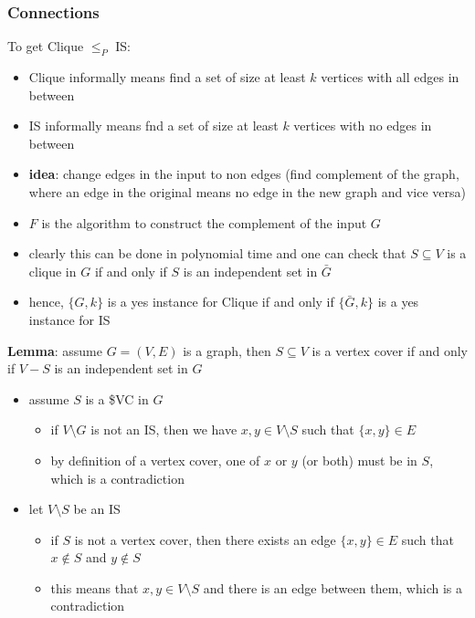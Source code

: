 \documentclass[11pt]{article}
\begin{document}
\subsubsection{Connections}
\label{sec:org9b2162a}
To get Clique \(\le_{P}\) IS:
\begin{itemize}
\item Clique informally means find a set of size at least \(k\) vertices with all edges in between
\item IS informally means fnd a set of size at least \(k\) vertices with no edges in between
\item \textbf{idea}: change edges in the input to non edges (find complement of the graph, where an
edge in the original means no edge in the new graph and vice versa)
\item \(F\) is the algorithm to construct the complement of the input \(G\)
\item clearly this can be done in polynomial time and one can check that \(S \subseteq V\) is a
clique in \(G\) if and only if \(S\) is an independent set in \(\bar{G}\)
\item hence, \(\{G,k\}\) is a yes instance for Clique if and only if \(\{\bar{G}, k\}\) is a yes
instance for IS
\end{itemize}

\textbf{Lemma}: assume \(G = (V,E)\) is a graph, then \(S \subseteq V\) is a vertex cover if and only
if \(V-S\) is an independent set in \(G\)
\begin{itemize}
\item assume \(S\) is a \$VC in \(G\)
\begin{itemize}
\item if \(V \setminus G\) is not an IS, then we have \(x,y \in V \setminus S\) such that
\(\{x, y\} \in E\)
\item by definition of a vertex cover, one of \(x\) or \(y\) (or both) must be in \(S\), which is
a contradiction
\end{itemize}
\item let \(V \setminus S\) be an IS
\begin{itemize}
\item if \(S\) is not a vertex cover, then there exists an edge \(\{x,y\} \in E\) such that
\(x \not\in S\) and \(y \not\in S\)
\item this means that \(x,y \in V \setminus S\) and there is an edge between them, which
is a contradiction
\end{itemize}
\end{itemize}
\end{document}
